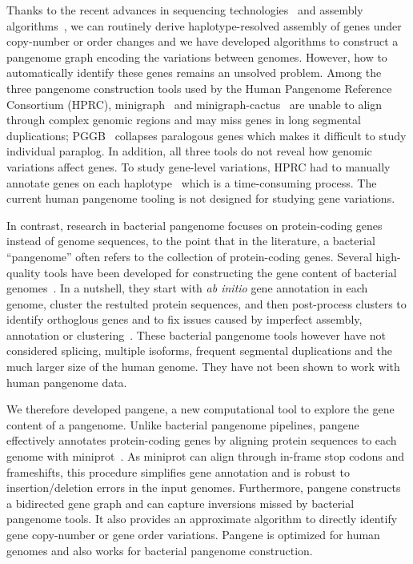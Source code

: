 \documentclass[webpdf,contemporary,large,namedate]{oup-authoring-template}%
\begin{document}
Thanks to the recent advances in sequencing technologies~\citep{Wenger_2019} and assembly algorithms~\citep{Nurk:2020we,Cheng:2021aa,Rautiainen:2023aa},
we can routinely derive haplotype-resolved assembly of genes under copy-number or order changes
and we have developed algorithms to construct a pangenome graph encoding the variations between genomes.
However, how to automatically identify these genes remains an unsolved problem.
Among the three pangenome construction tools used by the Human Pangenome Reference Consortium (HPRC),
minigraph~\citep{Li:2020aa} and minigraph-cactus~\citep{Hickey:2023aa} are
unable to align through complex genomic regions and may miss genes in long segmental duplications;
PGGB~\citep{Garrison2023.04.05.535718} collapses paralogous genes which makes it difficult to study individual paraplog.
In addition, all three tools do not reveal how genomic variations affect genes.
To study gene-level variations, HPRC
had to manually annotate genes on each haplotype~\citep{Liao:2023aa} which is a time-consuming process.
The current human pangenome tooling is not designed for studying gene variations.

In contrast, research in bacterial pangenome
focuses on protein-coding genes instead of genome sequences, to the point that
in the literature, a bacterial ``pangenome'' often refers to the collection of protein-coding genes.
Several high-quality tools have been developed for constructing the gene content of bacterial genomes~\citep{Page:2015aa,Ding:2018aa,Tonkin-Hill:2020aa,Gautreau:2020aa,Zhou:2020aa}.
In a nutshell, they start with \emph{ab initio} gene annotation in each genome,
cluster the restulted protein sequences,
and then post-process clusters to identify orthoglous genes
and to fix issues caused by imperfect assembly, annotation or clustering~\citep{Tonkin-Hill:2023aa}.
These bacterial pangenome tools however have not considered splicing,
multiple isoforms, frequent segmental duplications and the much larger size of the human genome.
They have not been shown to work with human pangenome data.

We therefore developed pangene, a new computational tool to explore the gene content of a pangenome.
Unlike bacterial pangenome pipelines, pangene effectively annotates protein-coding genes
by aligning protein sequences to each genome with miniprot~\citep{Li:2023ac}.
As miniprot can align through in-frame stop codons and frameshifts,
this procedure simplifies gene annotation and is robust to insertion/deletion errors in the input genomes.
Furthermore, pangene constructs a bidirected gene graph and can capture inversions
missed by bacterial pangenome tools.
It also provides an approximate algorithm to directly
identify gene copy-number or gene order variations.
Pangene is optimized for human genomes and also works for bacterial pangenome construction.
\end{document}
